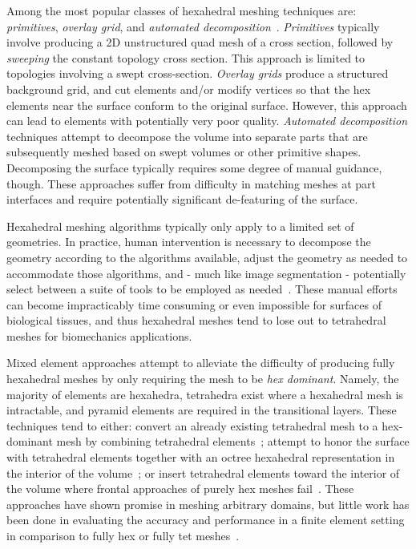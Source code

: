 Among the most popular classes of hexahedral meshing techniques are: \textit{primitives}, \textit{overlay grid}, and \textit{automated decomposition}~\cite{blacker_2001}. \textit{Primitives} typically involve producing a 2D unstructured quad mesh of a cross section, followed by \textit{sweeping} the constant topology cross section. This approach is limited to topologies involving a swept cross-section. \textit{Overlay grids} produce a structured background grid, and cut elements and/or modify vertices so that the hex elements near the surface conform to the original surface. However, this approach can lead to elements with potentially very poor quality. \textit{Automated decomposition} techniques attempt to decompose the volume into separate parts that are subsequently meshed based on swept volumes or other primitive shapes. Decomposing the surface typically requires some degree of manual guidance, though. These approaches suffer from difficulty in matching meshes at part interfaces and require potentially significant de-featuring of the surface.

Hexahedral meshing algorithms typically only apply to a limited set of geometries. In practice, human intervention is necessary to decompose the geometry according to the algorithms available, adjust the geometry as needed to accommodate those algorithms, and - much like image segmentation - potentially select between a suite of tools to be employed as needed~\cite{blacker_2001}. These manual efforts can become impracticably time consuming or even impossible for surfaces of biological tissues, and thus hexahedral meshes tend to lose out to tetrahedral meshes for biomechanics applications.

Mixed element approaches attempt to alleviate the difficulty of producing fully hexahedral meshes by only requiring the mesh to be \textit{hex dominant}. Namely, the majority of elements are hexahedra, tetrahedra exist where a hexahedral mesh is intractable, and pyramid elements are required in the transitional layers. These techniques tend to either: convert an already existing tetrahedral mesh to a hex-dominant mesh by combining tetrahedral elements~\cite{baudouin_2014, gao_2017}; attempt to honor the surface with tetrahedral elements together with an octree hexahedral representation in the interior of the volume~\cite{young_2008, lobos_2015}; or insert tetrahedral elements toward the interior of the volume where frontal approaches of purely hex meshes fail~\cite{blacker_2001}. These approaches have shown promise in meshing arbitrary domains, but little work has been done in evaluating the accuracy and performance in a finite element setting in comparison to fully hex or fully tet meshes~\cite{tautges_2001}.

